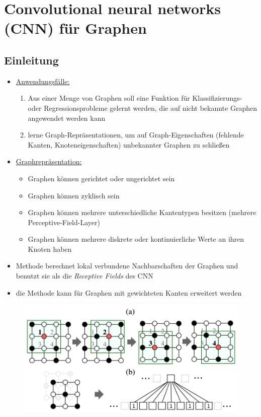\section{Convolutional neural networks (CNN) für Graphen}

\subsection{Einleitung}

\begin{itemize}
  \item \underline{Anwendungsfälle:}
  \begin{enumerate}
    \item Aus einer Menge von Graphen soll eine Funktion für Klassifizierungs- oder Regressionsprobleme gelernt werden, die auf nicht bekannte Graphen angewendet werden kann
    \item lerne Graph-Repräsentationen, um auf Graph-Eigenschaften (fehlende Kanten, Knoteneigenschaften) unbekannter Graphen zu schließen
  \end{enumerate}
\item \underline{Graphrepräsentation:}
  \begin{itemize}
    \item Graphen können gerichtet oder ungerichtet sein
    \item Graphen können zyklisch sein
    \item Graphen können mehrere unterschiedliche Kantentypen besitzen (mehrere Perceptive-Field-Layer)
    \item Graphen können mehrere diskrete oder kontinuierliche Werte an ihren Knoten haben
  \end{itemize}
\item Methode berechnet lokal verbundene Nachbarschaften der Graphen und benutzt sie als die \emph{Receptive Fields} des CNN
\item die Methode kann für Graphen mit gewichteten Kanten erweitert werden
\end{itemize}

\begin{figure}[h]
  \centering
  \includegraphics[width=.5\textwidth]{images/cnn_graph}
\end{figure}


